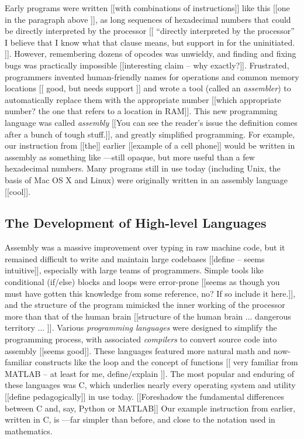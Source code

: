 \documentclass[thesis.tex]{subfiles}
\begin{document}
Early programs were written [[with combinations of instructions]] like this [[one in the paragraph above ]], as long sequences of hexadecimal numbers that could be directly interpreted by the processor [[ ``directly interpreted by the processor'' I believe that I know what that clause means, but support in for the uninitiated. ]]. However, remembering dozens of opcodes was unwieldy, and finding and fixing bugs was practically impossible [[interesting claim -- why exactly?]]. Frustrated, programmers invented human-friendly names for operations and common memory locations [[ good, but needs support  ]] and wrote a tool (called an \emph{assembler}) to automatically replace them with the appropriate number [[which appropriate number?  the one that refers to a location in RAM]]. This new programming language was called \emph{assembly} [[You can see the reader's issue the definition comes after a bunch of tough stuff.]], and greatly simplified programming. For example, our instruction from [[the]] earlier [[example of a cell phone]] would be written in assembly as something like ---still opaque, but more useful than a few hexadecimal numbers. Many programs still in use today (including Unix, the basis of Mac OS X and Linux) were originally written in an assembly language [[cool]].

\subsection{The Development of High-level Languages}

Assembly was a massive improvement over typing in raw machine code, but it remained difficult to write and maintain large codebases [[define -- seems intuitive]], especially with large teams of programmers. Simple tools like conditional (if/else) blocks and loops were error-prone [[seems as though you must have gotten this knowledge from some reference, no?  If so include it here.]], and the structure of the program mimicked the inner working of the processor more than that of the human brain [[structure of the human brain ... dangerous territory ... ]]. Various \emph{programming languages} were designed to simplify the programming process, with associated \emph{compilers} to convert source code into assembly [[seems good]]. These languages featured more natural math and now-familiar constructs like the  loop and the concept of functions [[  very familiar from MATLAB -- at least for me, define/explain ]]. The most popular and enduring of these languages was C, which underlies nearly every operating system and utility [[define pedagogically]] in use today. [[Foreshadow the fundamental differences between C and, say, Python or MATLAB]] Our example instruction from earlier, written in C, is ---far simpler than before, and close to the notation used in mathematics.
\end{document}
